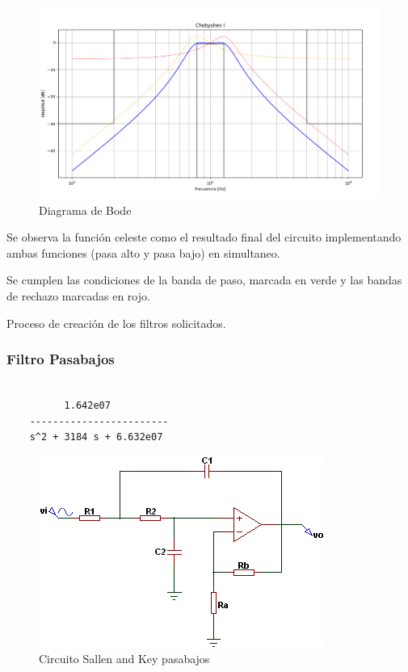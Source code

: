 \begin{figure}[H]
    \centering
    \includegraphics[width=1\linewidth]{figuras/chebyshev_rechazo.png}
    \caption{Diagrama de Bode}
\end{figure}

\hspace{1mm} Se observa la función celeste como el resultado final del circuito implementando ambas funciones (pasa alto y pasa bajo) en simultaneo.

Se cumplen las condiciones de la banda de paso, marcada en verde y las bandas de rechazo marcadas en rojo.\newline

\hspace{1mm} Proceso de creación de los filtros solicitados.

\subsubsection{Filtro Pasabajos}
\begin{verbatim}
	
	      1.642e07
	------------------------
	s^2 + 3184 s + 6.632e07
\end{verbatim}

\begin{figure}[H]
    \centering
    \includegraphics[width=0.75\linewidth]{figuras/pasabajo.teorico.png}
    \caption{Circuito Sallen and Key pasabajos}
    \label{fig:enter-label}
\end{figure}


